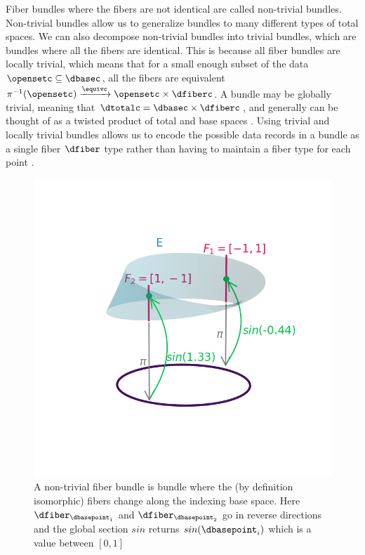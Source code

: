 \documentclass[10pt,journal,compsoc]{IEEEtran}
\theoremstyle{definition}
\theoremstyle{remark}
\begin{document}
Fiber bundles where the fibers are not identical are called non-trivial bundles. Non-trivial bundles allow us to generalize bundles to many different types of total spaces. We can also decompose non-trivial bundles into trivial bundles, which are bundles where all the fibers are identical. This is because all fiber bundles are locally trivial, which means that for a small enough subset of the data $\opensetc \subseteq \dbasec$, all the fibers are equivalent $\pi^{-1}(\opensetc)\xrightarrow{\equivc} \opensetc \times \dfiberc$. A bundle may be globally trivial, meaning that $\dtotalc = \dbasec \times \dfiberc$, and generally can be thought of as a twisted product of total and base spaces \cite{munkresElementsAlgebraicTopology1984}. Using trivial and locally trivial bundles allows us to encode the possible data records in a bundle as a single fiber $\dfiber$ type rather than having to maintain a fiber type for each point \dbasepoint.

\begin{figure}[h!]
  \includegraphics[width=\columnwidth]{fbtau.png}
  \caption{A non-trivial fiber bundle is bundle where the (by definition isomorphic) fibers change along the indexing base space. Here $\dfiber_{\dbasepoint_1}$ and $\dfiber_{\dbasepoint_2}$ go in reverse directions and the global section $sin$ returns $sin(\dbasepoint_{i})$ which is a value between $[0,1]$
  \label{fig:atct:stripbundle}}
\end{figure}
\end{document}
